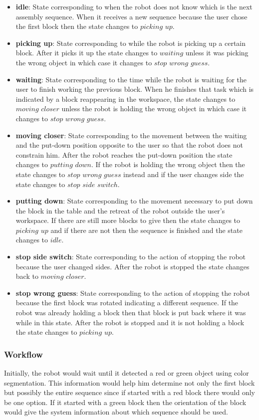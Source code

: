 {\begin{itemize}
    \item \textbf{idle}: State corresponding to when the robot does not know which is the next assembly sequence. When it receives a new sequence because the user chose the first block then the state changes to $picking$ $up$.
    \item \textbf{picking up}: State corresponding to while the robot is picking up a certain block. After it picks it up the state changes to $waiting$ unless it was picking the wrong object in which case it changes to $stop$ $wrong$ $guess$.
    \item \textbf{waiting}: State corresponding to the time while the robot is waiting for the user to finish working the previous block. When he finishes that task which is indicated by a block reappearing in the workspace, the state changes to $moving$ $closer$ unless the robot is holding the wrong object in which case it changes to $stop$ $wrong$ $guess$.
    \item \textbf{moving closer}: State corresponding to the movement between the waiting and the put-down position opposite to the user so that the robot does not constrain him. After the robot reaches the put-down position the state changes to $putting$ $down$. If the robot is holding the wrong object then the state changes to $stop$ $wrong$ $guess$ instead and if the user changes side the state changes to $stop$ $side$ $switch$.
    \item \textbf{putting down}: State corresponding to the movement necessary to put down the block in the table and the retreat of the robot outside the user's workspace. If there are still more blocks to give then the state changes to $picking$ $up$ and if there are not then the sequence is finished and the state changes to $idle$.
    \item \textbf{stop side switch}: State corresponding to the action of stopping the robot because the user changed sides. After the robot is stopped the state changes back to $moving$ $closer$.
    \item \textbf{stop wrong guess}: State corresponding to the action of stopping the robot because the first block was rotated indicating a different sequence. If the robot was already holding a block then that block is put back where it was while in this state. After the robot is stopped and it is not holding a block the state changes to $picking$ $up$.
\end{itemize}

\subsubsection{Workflow}
Initially, the robot would wait until it detected a red or green object using color segmentation. This information would help him determine not only the first block but possibly the entire sequence since if started with a red block there would only be one option. If it started with a green block then the orientation of the block would give the system information about which sequence should be used.

}

